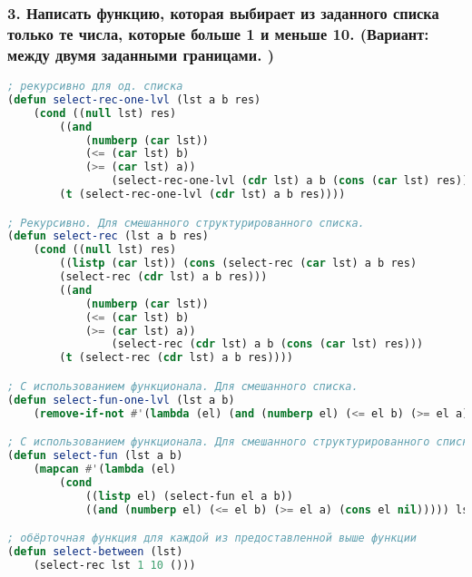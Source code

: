 \subsubsection*{3. Написать функцию, которая выбирает из заданного списка только те числа, которые	больше 1 и меньше 10. (Вариант: между двумя заданными границами. )}
\begin{lstlisting}[language=Lisp]
; рекурсивно для од. списка
(defun select-rec-one-lvl (lst a b res)
	(cond ((null lst) res)
		((and 
			(numberp (car lst)) 
			(<= (car lst) b) 
			(>= (car lst) a)) 
				(select-rec-one-lvl (cdr lst) a b (cons (car lst) res)))
		(t (select-rec-one-lvl (cdr lst) a b res))))

; Рекурсивно. Для смешанного структурированного списка.
(defun select-rec (lst a b res)
	(cond ((null lst) res)
		((listp (car lst)) (cons (select-rec (car lst) a b res)
		(select-rec (cdr lst) a b res)))
		((and
			(numberp (car lst))
			(<= (car lst) b) 
			(>= (car lst) a)) 
				(select-rec (cdr lst) a b (cons (car lst) res)))
		(t (select-rec (cdr lst) a b res))))

; С использованием функционала. Для смешанного списка.
(defun select-fun-one-lvl (lst a b)
	(remove-if-not #'(lambda (el) (and (numberp el) (<= el b) (>= el a))) lst))

; С использованием функционала. Для смешанного структурированного списка.
(defun select-fun (lst a b)
	(mapcan #'(lambda (el) 
		(cond
			((listp el) (select-fun el a b))
			((and (numberp el) (<= el b) (>= el a) (cons el nil))))) lst))

; обёрточная функция для каждой из предоставленной выше функции
(defun select-between (lst)
	(select-rec lst 1 10 ()))
\end{lstlisting}

